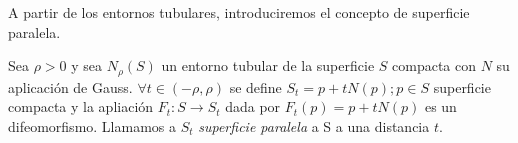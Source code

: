 A partir de los entornos tubulares, introduciremos el concepto de superficie paralela.

\begin{definition}
Sea $\rho > 0$ y sea $N_\rho(S)$ un entorno tubular de la superficie $S$ compacta con $N$ su aplicación de Gauss. $\forall t \in (-\rho, \rho)$ se define $S_t={p + tN(p); p \in S}$ superficie compacta y la apliación $F_t: S \longrightarrow S_t$ dada por $F_t(p)=p+tN(p)$ es un difeomorfismo.
Llamamos a $S_t$ \textit{superficie paralela} a S a una distancia $t$.
\end{definition}